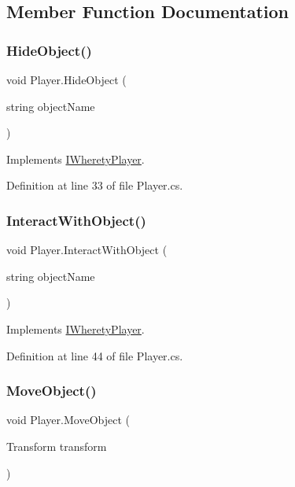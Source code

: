 \subsection{Member Function Documentation}
\mbox{\label{class_player_ab1b799d89cacee820f5a1e83cf71b440}} 
\subsubsection{\texorpdfstring{HideObject()}{HideObject()}}
{\footnotesize\ttfamily void Player.\+Hide\+Object (\begin{DoxyParamCaption}\item[{string}]{object\+Name }\end{DoxyParamCaption})}



Implements \mbox{\hyperlink{interface_i_wherety_player_a2cd247a5438cb6b3142046991f39352c}{I\+Wherety\+Player}}.



Definition at line 33 of file Player.\+cs.

\mbox{\label{class_player_ac4db0b8b352f511d0d0715f755876c4e}} 
\subsubsection{\texorpdfstring{InteractWithObject()}{InteractWithObject()}}
{\footnotesize\ttfamily void Player.\+Interact\+With\+Object (\begin{DoxyParamCaption}\item[{string}]{object\+Name }\end{DoxyParamCaption})}



Implements \mbox{\hyperlink{interface_i_wherety_player_af8af069999158f329d99f2709b0b4fb3}{I\+Wherety\+Player}}.



Definition at line 44 of file Player.\+cs.

\mbox{\label{class_player_ac8cf603009908d2e9b95fc4aff6ced70}} 
\subsubsection{\texorpdfstring{MoveObject()}{MoveObject()}}
{\footnotesize\ttfamily void Player.\+Move\+Object (\begin{DoxyParamCaption}\item[{Transform}]{transform }\end{DoxyParamCaption})}



